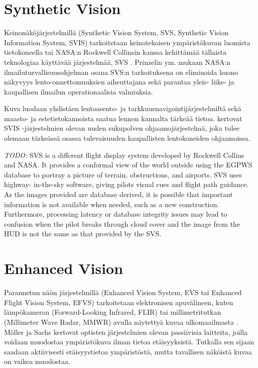\documentclass[utf8,bachelor,manualbib]{gradu3}
\begin{document}
\section{Synthetic Vision}

Keinonäköjärjestelmillä (Synthetic Vision System, SVS, Synthetic Vision Information System, SVIS) tarkoitetaan keinotekoisen ympäristökuvan luomista tietokoneella \citep{baileyym2007} tai NASA:n Rockwell Collinsin kanssa kehittämää tällaista teknologiaa käyttävää järjestelmää, SVS \citep{crawford2006}. Prinzelin ym. \citeyearpar{prinzel2004} mukaan NASA:n ilmailuturvallisuusohjelman osana SVS:n tarkoituksena on eliminoida huono näkyvyys lento-onnettomuuksien aiheuttajana sekä parantaa yleis- liike- ja kaupallisen ilmailun operationaalisia valmiuksia.

Kuva luodaan yhdistäen lentoasento- ja tarkkuusnavigointijärjestelmiltä sekä maasto- ja estetietokannoista saatua lennon kannalta tärkeää tietoa. \cite{schnellym2004} kertovat SVIS -järjestelmien olevan uuden sukupolven ohjaamojärjestelmä, joka tulee olemaan tärkeässä osassa tulevaisuuden kaupallisten lentokoneiden ohjaamoissa.








\emph{TODO:}
SVS is a different flight display system developed by Rockwell Collins and
NASA. It provides a conformal view of the world outside using the EGPWS database
to portray a picture of terrain, obstructions, and airports. SVS uses highway-
in-the-sky software, giving pilots visual cues and flight path guidance. As the
images provided are database derived, it is possible that important information is
not available when needed, such as a new construction. Furthermore, processing
latency or database integrity issues may lead to confusion when the pilot breaks
through cloud cover and the image from the HUD is not the same as that provided
by the SVS.\citep{crawford2006}



\section{Enhanced Vision}

Parannetun näön järjestelmillä (Enhanced Vision System, EVS tai Enhanced Flight Vision System, EFVS) tarkoitetaan elektronisen apuvälineen, kuten lämpökameran (Forward-Looking Infrared, FLIR) tai millimetritutkan (Millimeter Wave Radar, MMWR) avulla näytettyä kuvaa ulkomaailmasta \citep{baileyym2007}. Möller ja Sachs \citeyearpar{mollersachs1994} kertovat optisten järjestelmien olevan passiivisia laitteita, joilla voidaan muodostaa ympäristökuva ilman tietoa etäisyyksistä. Tutkalla sen sijaan saadaan aktiivisesti etäisyystietoa ympäristöstä, mutta tavallisen näköistä kuvaa on vaikea muodostaa.
\end{document}
